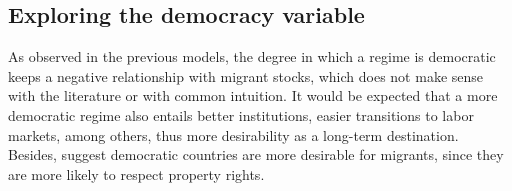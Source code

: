 \documentclass[../main.tex]{subfiles}
\begin{document}
\subsection{Exploring the democracy variable}
\begin{figure}[H]
\centering
{}
\end{figure}
As observed in the previous models, the degree in which a regime is democratic keeps a negative relationship with migrant stocks, which does not make sense with the literature or with common intuition. It would be expected that a more democratic regime also entails better institutions, easier transitions to labor markets, among others, thus more desirability as a long-term destination. Besides, \textcite{Beine.2008} suggest democratic countries are more desirable for migrants, since they are more likely to respect property rights.
\end{document}
